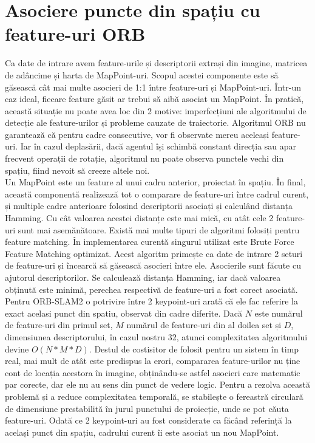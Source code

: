\documentclass[12pt,a4paper]{report}
\begin{document}
\section{Asociere puncte din spațiu cu feature-uri ORB}
Ca date de intrare avem feature-urile și descriptorii extrași din imagine, matricea
de adâncime și harta de MapPoint-uri. Scopul acestei componente este să găsească
cât mai multe asocieri de 1:1 între feature-uri și MapPoint-uri. Într-un caz ideal,
fiecare feature găsit ar trebui să aibă asociat un MapPoint. În pratică, această situație
nu poate avea loc din 2 motive: imperfecțiuni ale algoritmului de detecție ale feature-urilor 
și probleme cauzate de traiectorie. Algoritmul ORB nu garantează că pentru cadre 
consecutive, vor fi observate mereu aceleași feature-uri. Iar în cazul deplasării,
dacă agentul își schimbă constant direcția sau apar frecvent operații de rotație, algoritmul 
nu poate observa punctele vechi din spațiu, fiind nevoit să creeze altele noi.\\
Un MapPoint este un feature al unui cadru anterior, proiectat în spațiu. În final, 
această componentă realizează tot o comparare de feature-uri între cadrul curent, 
și multiple cadre anterioare folosind descriptorii asociați și calculând distanța Hamming.
Cu cât valoarea acestei distanțe este mai mică, cu atât cele 2 feature-uri sunt 
mai asemănătoare. Există mai multe tipuri de algoritmi folosiți pentru feature 
matching. În implementarea curentă singurul utilizat este Brute Force Feature Matching
optimizat. Acest algoritm primește ca date de intrare 2 seturi de feature-uri și 
încearcă să găsească asocieri între ele. Asocierile sunt făcute cu ajutorul descriptorilor.
Se calculează distanța Hamming, iar dacă valoarea obținută este minimă, perechea 
respectivă de feature-uri a fost corect asociată. Pentru ORB-SLAM2 
o potrivire între 2 keypoint-uri arată că ele fac referire la exact acelasi punct din spatiu,
observat din cadre diferite.
Dacă \(N\) este numărul de feature-uri din primul set, \(M\) numărul de feature-uri din 
al doilea set și \(D\), dimensiunea descriptorului, în cazul nostru 32, atunci complexitatea
algoritmului devine \(O(N * M * D)\). Destul de costisitor de folosit
pentru un sistem în timp real, mai mult de atât este predispus la erori, compararea 
feature-urilor nu ține cont de locația acestora în imagine, obținându-se astfel asocieri
care matematic par corecte, dar ele nu au sens din punct de vedere logic. Pentru a rezolva
această problemă și a reduce complexitatea temporală, se stabilește o fereastră circulară de 
dimensiune prestabilită în jurul punctului de proiecție, unde se pot căuta feature-uri.
Odată ce 2 keypoint-uri au fost considerate ca făcând referință la același punct din spațiu,
cadrului curent îi este asociat un nou MapPoint. 
\end{document}
